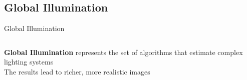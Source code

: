 \documentclass[10pt,compress,professionalfont]{beamer}
\begin{document}
\subsection{Global Illumination}
\begin{frame}{Global Illumination}

    \begin{columns}
        \begin{column}{0.65\textwidth}
            {\bf Global Illumination} represents the set of algorithms that estimate complex lighting systems\\
            \vspace{8mm}
            The results lead to richer, more realistic images\\


\end{column}
\end{columns}
\end{frame}
\end{document}
